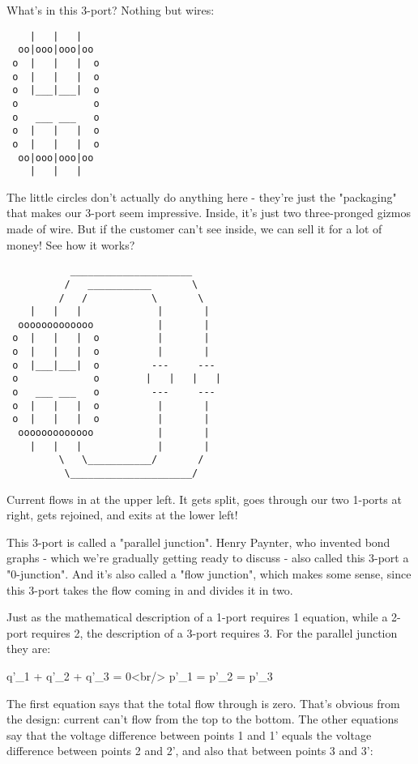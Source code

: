What's in this 3-port?  Nothing but wires:


\begin{verbatim}
    |   |   |
  oo|ooo|ooo|oo
 o  |   |   |  o
 o  |   |   |  o
 o  |___|___|  o
 o             o
 o   ___ ___   o
 o  |   |   |  o
 o  |   |   |  o
  oo|ooo|ooo|oo
    |   |   |

\end{verbatim}
    

The little circles don't actually do anything here - they're just the
"packaging" that makes our 3-port seem impressive.   Inside, it's
just two three-pronged gizmos made of wire.  But if the customer can't 
see inside, we can sell it for a lot of money!  See how it works?

\begin{verbatim}
           _____________________
          /   ___________       \
         /   /           \       \
    |   |   |             |       |
  ooooooooooooo           |       |
 o  |   |   |  o          |       |
 o  |   |   |  o          |       |
 o  |___|___|  o         ---     ---
 o             o        |   |   |   |
 o   ___ ___   o         ---     ---
 o  |   |   |  o          |       |
 o  |   |   |  o          |       |
  ooooooooooooo           |       |
    |   |   |             |       |
         \   \___________/       /  
          \_____________________/    
\end{verbatim}
    

Current flows in at the upper left.  It gets split, goes through our
two 1-ports at right, gets rejoined, and exits at the lower left!

This 3-port is called a "parallel junction".  Henry Paynter,
who invented bond graphs - which we're gradually getting ready to
discuss - also called this 3-port a "0-junction".  And it's also
called a "flow junction", which makes some sense, since this
3-port takes the flow coming in and divides it in two.

Just as the mathematical description of a 1-port requires 1 equation,
while a 2-port requires 2, the description of a 3-port requires 3.
For the parallel junction they are:

  q'_{1} + q'_{2} + q'_{3} = 0<br/>
  p'_{1} = p'_{2} = p'_{3}

The first equation says that the total flow through is zero.  That's
obvious from the design: current can't flow from the top to the
bottom.  The other equations say that the voltage difference between
points 1 and 1' equals the voltage difference between points 2 and 2',
and also that between points 3 and 3':

